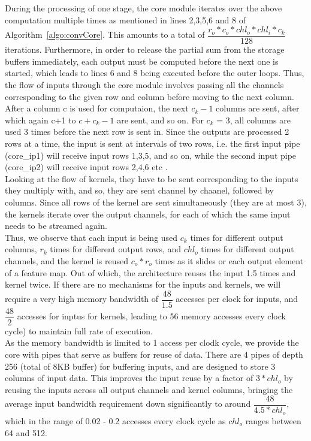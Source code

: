 \documentclass[a4paper,12pt, final]{report}
\begin{document}
During the processing of one stage, the core module iterates over the above computation multiple times as mentioned in lines 2,3,5,6 and 8 of Algorithm~\ref{algo:convCore}. This amounts to a total of $\dfrac{r_o*c_o*chl_o*chl_i*c_k}{128}$ iterations. Furthermore, in order to release the partial sum from the storage buffers immediately, each output must be computed before the next one is started, which leads to lines 6 and 8 being executed before the outer loops. Thus, the flow of inputs through the core module involves passing all the channels corresponding to the given row and column before moving to the next column. After a column c is used for computaion, the next $c_k-1$ columns are sent, after which again c+1 to $c+c_k-1$ are sent, and so on. For $c_k$ =  3, all columns are used 3 times before the next row is sent in. Since the outputs are processed 2 rows at a time, the input is sent at intervals of two rows, i.e. the first input pipe (core\_ip1) will receive input rows 1,3,5, and so on, while the second input pipe (core\_ip2) will receive input rows 2,4,6 etc . 
\\

Looking at the flow of kernels, they have to be sent corresponding to the inputs they multiply with, and so, they are sent channel by chaanel, followed by columns. Since all rows of the kernel are sent simultaneously (they are at most 3), the kernels iterate over the output channels, for each of which the same input needs to be streamed again.
\\

Thus, we observe that each input is being used $c_k$ times for different output columns, $r_k$ times for different output rows, and $chl_o$ times for different output channels, and the kernel is reused $c_o*r_o$ times as it slides or each output element of a feature map. Out of which, the architecture reuses the input 1.5 times and kernel twice. If there are no mechanisms for the inputs and kernels, we will require a very high memory bandwidth of $\dfrac{48}{1.5}$ accesses per clock for inputs, and $\dfrac{48}{2}$ accesses for inptus for kernels, leading to 56 memory accesses every clock cycle) to maintain full rate of execution.
\\

As the memory bandwidth is limited to 1 access per clodk cycle, we provide the core with pipes that serve as buffers for reuse of data. There are 4 pipes of depth 256 (total of 8KB buffer) for buffering inputs, and are designed to store 3 columns of input data. This improves the input reuse by a factor of $3*chl_o$ by reusing the inputs across all output channels and kernel columns, bringing the average input bandwidth requirement down significantly to around $\dfrac{48}{4.5*chl_o}$, which in the range of 0.02 - 0.2 accesses every clock cycle as $chl_o$ ranges between 64 and 512.
\\
\end{document}
